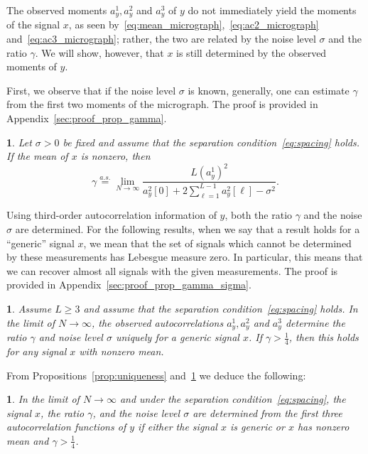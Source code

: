 \documentclass[12pt]{article}
\newcommand{\1}{\mathbf{1}}
\newcommand{\aseq}{\stackrel{a.s.}{=}}
\theoremstyle{plain}
\theoremstyle{definition}
\theoremstyle{remark}
\theoremstyle{plain}
\theoremstyle{remark}
\theoremstyle{plain}
\newtheorem{corollary}[thm]{\protect\corollaryname}
\theoremstyle{plain}
\theoremstyle{plain}
\newtheorem{proposition}[thm]{\protect\propositionname}
\providecommand{\corollaryname}{Corollary}
\providecommand{\propositionname}{Proposition}
\numberwithin{equation}{section}
\begin{document}
The observed moments $a_y^1,a_y^2$ and $a_y^3$ of $y$ do not immediately yield the moments of the signal $x$, as seen by~\eqref{eq:mean_micrograph},~\eqref{eq:ac2_micrograph} and~\eqref{eq:ac3_micrograph}; rather, the two are related by the noise level $\sigma$ and the ratio $\gamma$. We will show, however, that $x$ is still determined by the observed moments of $y$.

First, we observe that if the noise level $\sigma$ is known, generally, one can estimate $\gamma$ from the first two moments of the micrograph. The proof is provided in Appendix~\ref{sec:proof_prop_gamma}.

\begin{proposition} \label{prop:gamma}
	Let $\sigma > 0$ be fixed and assume that the separation condition~\eqref{eq:spacing} holds. If the mean of $x$ is nonzero, then 
	\begin{equation}
	\gamma  \aseq \lim_{N \to \infty}\frac{L (a^1_y)^2}{a_y^2[0] + 2\sum_{\ell = 1}^{L-1}a_y^2[\ell]-\sigma^2}.
	\end{equation}
\end{proposition}

Using third-order autocorrelation information of $y$, both the ratio $\gamma$ and the noise $\sigma$ are determined. For the following results, when we say that a result holds for a ``generic'' signal $x$, we mean that the set of signals which cannot be determined by these measurements
has Lebesgue measure zero. 
In particular, this means that we can recover
almost all signals with the given measurements. The proof is provided in Appendix~\ref{sec:proof_prop_gamma_sigma}.

\begin{proposition} \label{prop:gamma_sigma}
	Assume $L \geq 3$ and assume that the separation condition~\eqref{eq:spacing} holds. 
	In the limit of $N\to \infty$, the observed autocorrelations $a_y^1,a_y^2$ and  $a_y^3$ determine the ratio $\gamma$ and noise level $\sigma$ uniquely for a generic signal $x$. If $\gamma > \frac{1}{4}$, then this holds for any signal $x$ with nonzero mean. 
\end{proposition}

From Propositions~\ref{prop:uniqueness} and~\ref{prop:gamma_sigma} we   deduce the following:
\begin{corollary}
	In the limit of $N\to \infty$ and under the separation condition~\eqref{eq:spacing}, the signal $x$, the ratio $\gamma$, and the noise level $\sigma$ are determined from the first three autocorrelation functions of $y$ if either the signal $x$ is generic or $x$ has nonzero mean  and $\gamma > \frac{1}{4}$.
\end{corollary}
\end{document}

